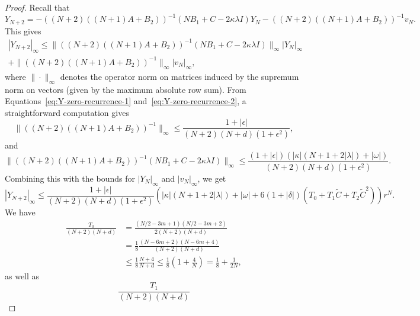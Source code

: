 \documentclass[11pt]{article}
\begin{document}
\begin{proof}
  Recall that
  \begin{equation*}
    Y_{N + 2} = -((N + 2)((N + 1)A + B_{2}))^{-1}(NB_{1} + C - 2\kappa\lambda I)Y_{N} - ((N + 2)((N + 1)A + B_{2}))^{-1}v_{N}.
  \end{equation*}
  This gives
  \begin{multline*}
    |Y_{N + 2}|_{\infty} \leq \|((N + 2)((N + 1)A + B_{2}))^{-1}(NB_{1} + C - 2\kappa\lambda I)\|_{\infty}|Y_{N}|_{\infty}\\
    + \|((N + 2)((N + 1)A + B_{2}))^{-1}\|_{\infty}|v_{N}|_{\infty},
  \end{multline*}
  where \(\|\cdot\|_{\infty}\) denotes the operator norm on matrices
  induced by the supremum norm on vectors (given by the maximum
  absolute row sum). From Equations~\eqref{eq:Y-zero-recurrence-1}
  and~\eqref{eq:Y-zero-recurrence-2}, a straightforward computation
  gives
  \begin{equation*}
    \|((N + 2)((N + 1)A + B_{2}))^{-1}\|_{\infty}
    \leq \frac{1 + |\epsilon|}{(N + 2)(N + d)(1 + \epsilon^{2})},
  \end{equation*}
  and
  \begin{equation*}
    \|((N + 2)((N + 1)A + B_{2}))^{-1}(NB_{1} + C - 2\kappa\lambda I)\|_{\infty}
    \leq \frac{(1 + |\epsilon|)(|\kappa|(N + 1 + 2|\lambda|) + |\omega|)}{(N + 2)(N + d)(1 + \epsilon^{2})}.
  \end{equation*}
  Combining this with the bounds for \(|Y_{N}|_{\infty}\) and
  \(|v_{N}|_{\infty}\), we get
  \begin{equation*}
    |Y_{N + 2}|_{\infty} \leq
    \frac{1 + |\epsilon|}{(N + 2)(N + d)(1 + \epsilon^{2})}\left(
    |\kappa|(N + 1 + 2|\lambda|) + |\omega|
    + 6(1 + |\delta|)(T_{0} + T_{1}\tilde{C} + T_{2}\tilde{C}^{2})
    \right)r^{N}.
  \end{equation*}
  We have
  \begin{equation*}
    \begin{split}
      \frac{T_{0}}{(N + 2)(N + d)}
      &= \frac{(N/2 - 3m + 1)(N/2 - 3m + 2)}{2(N + 2)(N + d)}\\
      &= \frac{1}{8}\frac{(N - 6m + 2)(N - 6m + 4)}{(N + 2)(N + d)}\\
      &\leq \frac{1}{8}\frac{N + 4}{N + d}
        \leq \frac{1}{8}\left(1 + \frac{4}{N}\right)
        = \frac{1}{8} + \frac{1}{2N},
    \end{split}
  \end{equation*}
  as well as
  \begin{equation*}
    \frac{T_{1}}{(N + 2)(N + d)}

\end{equation*}
\end{proof}
\end{document}
